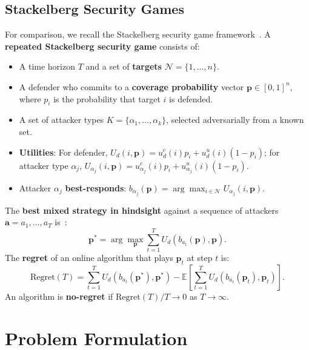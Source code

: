 \documentclass[sigconf]{aamas}
\newcommand{\E}{\mathbb{E}}
\begin{document}
\subsection{Stackelberg Security Games}
\label{sec:ssg}

For comparison, we recall the Stackelberg security game framework~\cite{Tambe2012, Balcan2015}. A \textbf{repeated Stackelberg security game} consists of:
\begin{itemize}
    \item A time horizon $T$ and a set of \textbf{targets} $\mathcal{N} = \{1, \ldots, n\}$.
    \item A defender who commits to a \textbf{coverage probability} vector $\mathbf{p} \in [0,1]^n$, where $p_i$ is the probability that target $i$ is defended.
    \item A set of attacker types $K = \{\alpha_1, \ldots, \alpha_k\}$, selected adversarially from a known set.
    \item \textbf{Utilities}: For defender, $U_d(i, \mathbf{p}) = u_d^c(i) p_i + u_d^u(i)(1 - p_i)$; for attacker type $\alpha_j$, $U_{\alpha_j}(i, \mathbf{p}) = u_{\alpha_j}^c(i) p_i + u_{\alpha_j}^u(i)(1 - p_i)$.
    \item Attacker $\alpha_j$ \textbf{best-responds}: $b_{\alpha_j}(\mathbf{p}) = \arg\max_{i \in \mathcal{N}} U_{\alpha_j}(i, \mathbf{p})$.
\end{itemize}

The \textbf{best mixed strategy in hindsight} against a sequence of attackers $\mathbf{a} = a_1, \ldots, a_T$ is~\cite{Balcan2015}:
\begin{equation}
    \mathbf{p}^* = \arg\max_{\mathbf{p}} \sum_{t=1}^{T} U_d(b_{a_t}(\mathbf{p}), \mathbf{p}).
    \label{eq:best_hindsight}
\end{equation}
The \textbf{regret} of an online algorithm that plays $\mathbf{p}_t$ at step $t$ is:
\begin{equation}
    \mathrm{Regret}(T) = \sum_{t=1}^{T} U_d(b_{a_t}(\mathbf{p}^*), \mathbf{p}^*) - \E\!\left[\sum_{t=1}^{T} U_d(b_{a_t}(\mathbf{p}_t), \mathbf{p}_t)\right].
    \label{eq:regret_ssg}
\end{equation}
An algorithm is \textbf{no-regret} if $\mathrm{Regret}(T) / T \to 0$ as $T \to \infty$.

\section{Problem Formulation}
\label{sec:problem}
\end{document}
